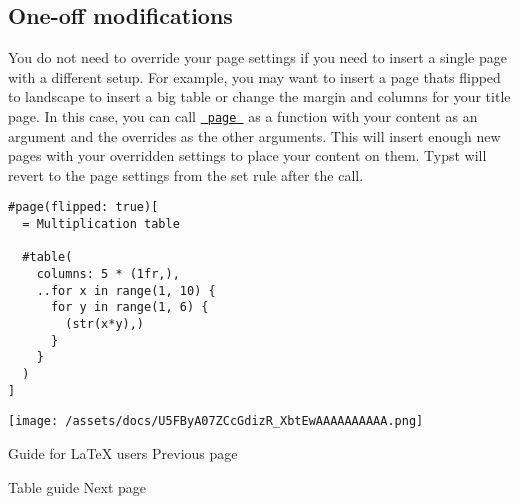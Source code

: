 \subsection{One-off modifications}\label{one-off-modifications}

You do not need to override your page settings if you need to insert a
single page with a different setup. For example, you may want to insert
a page that\textquotesingle s flipped to landscape to insert a big table
or change the margin and columns for your title page. In this case, you
can call \href{/docs/reference/layout/page/}{\texttt{\ page\ }} as a
function with your content as an argument and the overrides as the other
arguments. This will insert enough new pages with your overridden
settings to place your content on them. Typst will revert to the page
settings from the set rule after the call.

\begin{verbatim}
#page(flipped: true)[
  = Multiplication table

  #table(
    columns: 5 * (1fr,),
    ..for x in range(1, 10) {
      for y in range(1, 6) {
        (str(x*y),)
      }
    }
  )
]
\end{verbatim}

\texttt{[image: /assets/docs/U5FByA07ZCcGdizR\_XbtEwAAAAAAAAAA.png]}

\href{/docs/guides/guide-for-latex-users/}{\pandocbounded{}}

{ Guide for LaTeX users } { Previous page }

\href{/docs/guides/table-guide/}{\pandocbounded{}}

{ Table guide } { Next page }
